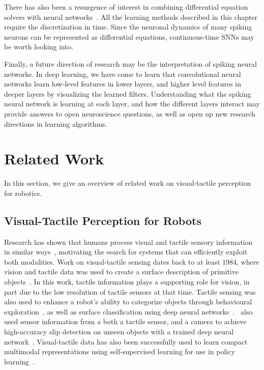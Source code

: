\documentclass[fyp]{socreport}
\begin{document}
There has also been a resurgence of interest in combining differential equation
solvers with neural networks~\cite{NIPS2018_7892}. All the learning methods
described in this chapter require the discretization in time. Since the neuronal
dynamics of many spiking neurons can be represented as differential equations,
continuous-time SNNs may be worth looking into.

Finally, a future direction of research may be the interpretation of spiking
neural networks. In deep learning, we have come to learn that convolutional
neural networks learn low-level features in lower layers, and higher level
features in deeper layers by visualizing the learned filters. Understanding what
the spiking neural network is learning at each layer, and how the different
layers interact may provide answers to open neuroscience questions, as well as
open up new research directions in learning algorithms.

\chapter{Related Work\label{cha:related}}

In this section, we give an overview of related work on visual-tactile
perception for robotics.

\section{Visual-Tactile Perception for Robots}

Research has shown that humans process visual and tactile sensory information in
similar ways~\cite{Lacey:2015}, motivating the search for systems that can
efficiently exploit both modalities. Work on visual-tactile sensing dates back
to at least 1984, where vision and tactile data was used to create a surface
description of primitive objects~\cite{allenil_surfac}. In this work, tactile
information plays a supporting role for vision, in part due to the low
resolution of tactile sensors at that time. Tactile sensing was also used to
enhance a robot's ability to categorize objects through behavioural
exploration~\cite{sinapov14_learn}, as well as surface classification using deep
neural
networks~\cite{gao2016deep}.~\citeauthor{li18_slip_detec_combin_tactil_visual_infor}
also used sensor information from a both a tactile sensor, and a camera to
achieve high-accuracy slip detection on unseen objects with a trained deep
neural network~\cite{li18_slip_detec_combin_tactil_visual_infor}. Visual-tactile
data has also been successfully used to learn compact multimodal representations
using self-supervised learning for use in policy learning~\cite{lee2019making}.
\end{document}
